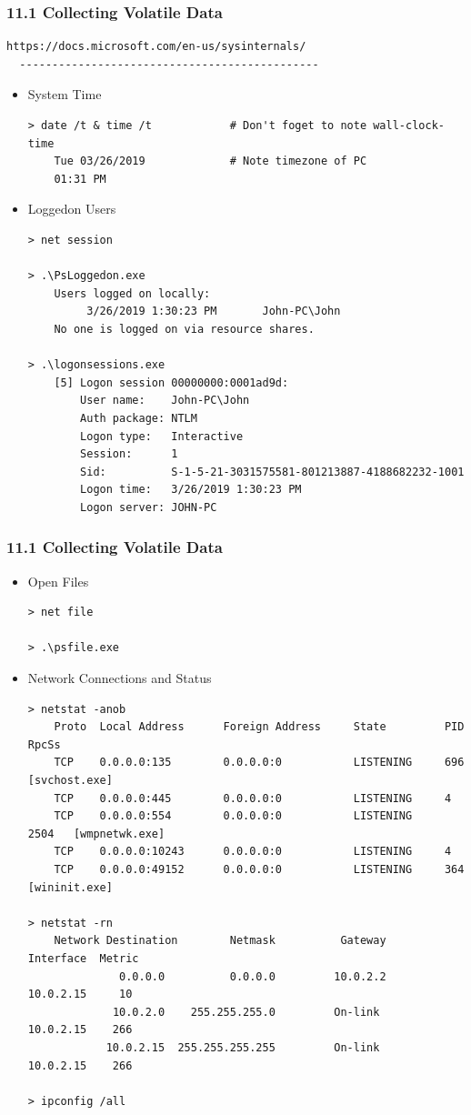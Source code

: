 \begin{frame}[fragile]
  \frametitle{11.1 Collecting Volatile Data}
  \begin{lstlisting}[basicstyle=\tiny]
  https://docs.microsoft.com/en-us/sysinternals/
  ----------------------------------------------
  \end{lstlisting}
  \begin{itemize}
        \item System Time
\begin{lstlisting}[basicstyle=\tiny]
> date /t & time /t            # Don't foget to note wall-clock-time
    Tue 03/26/2019             # Note timezone of PC
    01:31 PM
\end{lstlisting}
        \item Loggedon Users
\begin{lstlisting}[basicstyle=\tiny]
> net session

> .\PsLoggedon.exe
    Users logged on locally:
         3/26/2019 1:30:23 PM       John-PC\John
    No one is logged on via resource shares.

> .\logonsessions.exe
    [5] Logon session 00000000:0001ad9d:
        User name:    John-PC\John
        Auth package: NTLM
        Logon type:   Interactive
        Session:      1
        Sid:          S-1-5-21-3031575581-801213887-4188682232-1001
        Logon time:   3/26/2019 1:30:23 PM
        Logon server: JOHN-PC
\end{lstlisting}
    \end{itemize}
\end{frame}


\begin{frame}[fragile]
  \frametitle{11.1 Collecting Volatile Data}
  \begin{itemize}
        \item Open Files
\begin{lstlisting}[basicstyle=\tiny]
> net file

> .\psfile.exe
\end{lstlisting}
        \item Network Connections and Status
\begin{lstlisting}[basicstyle=\tiny]
> netstat -anob
    Proto  Local Address      Foreign Address     State         PID    RpcSs
    TCP    0.0.0.0:135        0.0.0.0:0           LISTENING     696    [svchost.exe]
    TCP    0.0.0.0:445        0.0.0.0:0           LISTENING     4
    TCP    0.0.0.0:554        0.0.0.0:0           LISTENING     2504   [wmpnetwk.exe]
    TCP    0.0.0.0:10243      0.0.0.0:0           LISTENING     4
    TCP    0.0.0.0:49152      0.0.0.0:0           LISTENING     364    [wininit.exe]

> netstat -rn
    Network Destination        Netmask          Gateway       Interface  Metric
              0.0.0.0          0.0.0.0         10.0.2.2        10.0.2.15     10
             10.0.2.0    255.255.255.0         On-link         10.0.2.15    266
            10.0.2.15  255.255.255.255         On-link         10.0.2.15    266

> ipconfig /all
\end{lstlisting}
    \end{itemize}
\end{frame}


